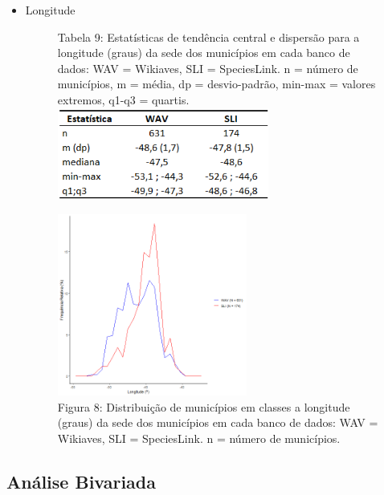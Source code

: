 \begin{itemize}
\item Longitude


\begin{figure}[h!]
\centering
{\scriptsize Tabela 9: Estatísticas de tendência central e dispersão para a longitude (graus) da sede dos municípios em cada banco de dados: WAV = Wikiaves, SLI = SpeciesLink. n = número de municípios, m = média, dp = desvio-padrão, min-max = valores extremos, q1-q3 = quartis.}
\\
\includegraphics[height = 3cm]{Tabelas/9.png}
\end{figure}


\begin{figure}[h!]
\centering
\includegraphics[height = 6cm]{Imagens/253.png}
\\{\scriptsize Figura 8: Distribuição de municípios em classes a longitude (graus) da sede dos municípios em cada banco de dados: WAV = Wikiaves, SLI = SpeciesLink. n = número de municípios.}
\end{figure}

\end{itemize}

\newpage

\subsection{Análise Bivariada}

